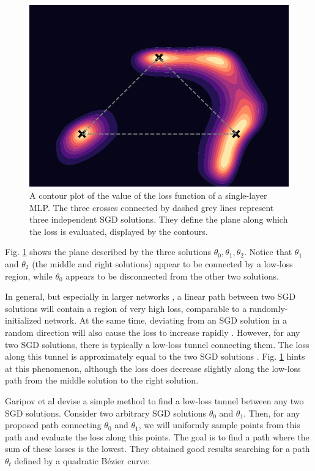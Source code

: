 \documentclass[12pt]{article}
\begin{document}
\begin{figure}[ht]
\centering
\includegraphics[width=14cm]{plots/loss_landscape.pdf}
\caption{A contour plot of the value of the loss function of a single-layer MLP. The three crosses connected by dashed grey lines represent three independent SGD solutions. They define the plane along which the loss is evaluated, displayed by the contours.}
\label{fig_loss_landscape}
\end{figure}

Fig. \ref{fig_loss_landscape} shows the plane described by the three solutions $\theta_0, \theta_1, \theta_2$. Notice that $\theta_1$ and $\theta_2$ (the middle and right solutions) appear to be connected by a low-loss region, while $\theta_0$ appears to be disconnected from the other two solutions.

In general, but especially in larger networks \cite{mode_connectivity}, a linear path between two SGD solutions will contain a region of very high loss, comparable to a randomly-initialized network. At the same time, deviating from an SGD solution in a random direction will also cause the loss to increase rapidly \cite{swag}. However, for any two SGD solutions, there is typically a low-loss tunnel connecting them. The loss along this tunnel is approximately equal to the two SGD solutions \cite{mode_connectivity}. Fig. \ref{fig_loss_landscape} hints at this phenomenon, although the loss does decrease slightly along the low-loss path from the middle solution to the right solution.

Garipov et al \cite{mode_connectivity} devise a simple method to find a low-loss tunnel between any two SGD solutions. Consider two arbitrary SGD solutions $\theta_0$ and $\theta_1$. Then, for any proposed path connecting $\theta_0$ and $\theta_1$, we will uniformly sample points from this path and evaluate the loss along this points. The goal is to find a path where the sum of these losses is the lowest. They obtained good results searching for a path $\theta_t$ defined by a quadratic Bézier curve:
\end{document}

